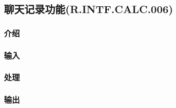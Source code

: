 \subsection{聊天记录功能(R.INTF.CALC.006)}
\subsubsection{介绍}
\subsubsection{输入}
\subsubsection{处理}
\subsubsection{输出}